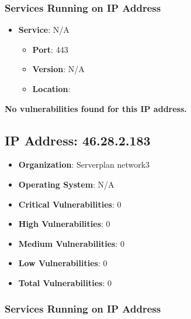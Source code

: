 \documentclass{article}
\begin{document}
\subsubsection*{Services Running on IP Address}

\begin{itemize}
    
        \item \textbf{Service}: N/A
        \begin{itemize}
            \item \textbf{Port}: 443
            \item \textbf{Version}:  N/A 
            \item \textbf{Location}: \href{  }{  }
        \end{itemize}
    
\end{itemize}


\textbf{No vulnerabilities found for this IP address.}




\clearpage



\subsection{IP Address: 46.28.2.183}

\begin{itemize}
    \item \textbf{Organization}: Serverplan network3
    \item \textbf{Operating System}:  N/A 
    \item \textbf{Critical Vulnerabilities}: 0
    \item \textbf{High Vulnerabilities}: 0
    \item \textbf{Medium Vulnerabilities}: 0
    \item \textbf{Low Vulnerabilities}: 0
    \item \textbf{Total Vulnerabilities}: 0
\end{itemize}

\subsubsection*{Services Running on IP Address}
\end{document}
